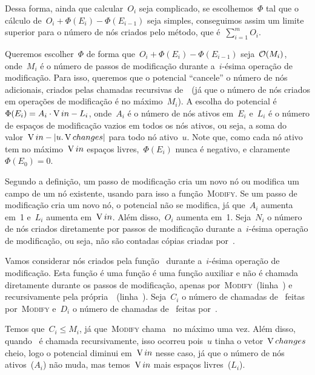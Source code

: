 \documentclass[main.tex]{subfiles}
\begin{document}
Dessa forma, ainda que calcular~$O_i$ seja complicado, se escolhemos~$\Phi$ tal que o cálculo de~${O_i + \Phi(E_i) - \Phi(E_{i-1})}$ seja simples, conseguimos assim um limite superior para o número de nós criados pelo método, que é~$\sum\limits_{i=1}^m{O_i}$.

Queremos escolher~$\Phi$ de forma que~${O_i + \Phi(E_i) - \Phi(E_{i-1})}$ seja~$\mathcal{O}(M_i)$, onde~$M_i$ é o número de passos de modificação durante a~$i$-ésima operação de modificação. Para isso, queremos que o potencial ``cancele'' o número de nós adicionais, criados pelas chamadas recursivas de~\textsc{}~(já que o número de nós criados em operações de modificação é no máximo~$M_i$). A escolha do potencial é~$\Phi(E_i) = A_i \cdot \operatorname{V}{in} - L_i$, onde~$A_i$ é o número de nós ativos em~$E_i$ e~$L_i$ é o número de espaços de modificação vazios em todos os nós ativos, ou seja, a soma do valor~$\operatorname{V}{in} - |u.\operatorname{V}{changes}|$ para todo nó ativo~$u$. Note que, como cada nó ativo tem no máximo~$\operatorname{V}{in}$ espaços livres,~$\Phi(E_i)$ nunca é negativo, e claramente~$\Phi(E_0) = 0$.

Segundo a definição, um passo de modificação cria um novo nó ou modifica um campo de um nó existente, usando para isso a função~\textsc{Modify}. Se um passo de modificação cria um novo nó, o potencial não se modifica, já que~$A_i$ aumenta em~1 e~$L_i$ aumenta em~$\operatorname{V}{in}$. Além disso,~$O_i$ aumenta em~1. Seja~$N_i$ o número de nós criados diretamente por passos de modificação durante a~$i$-ésima operação de modificação, ou seja, não são contadas cópias criadas por~\textsc{}.

Vamos considerar nós criados pela função~\textsc{} durante a~$i$-ésima operação de modificação. Esta função é uma função é uma função auxiliar e não é chamada diretamente durante os passos de modificação, apenas por~\textsc{Modify}~(linha~) e recursivamente pela própria~\textsc{}~(linha~). Seja~$C_i$ o número de chamadas de~\textsc{} feitas por~\textsc{Modify} e~$D_i$ o número de chamadas de~\textsc{} feitas por~\textsc{}.

Temos que~$C_i \leq M_i$, já que~\textsc{Modify} chama~\textsc{} no máximo uma vez. Além disso, quando~ é chamada recursivamente, isso ocorreu pois~$u$ tinha o vetor~$\operatorname{V}{changes}$ cheio, logo o potencial diminui em~$\operatorname{V}{in}$ nesse caso, já que o número de nós ativos~($A_i$) não muda, mas temos~$\operatorname{V}{in}$ mais espaços livres~($L_i$).
\end{document}
